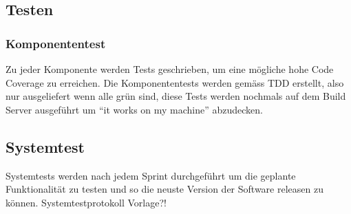 \documentclass[11pt]{scrartcl}
\begin{document}
\subsection{Testen}
\subsubsection{Komponententest}
Zu jeder Komponente werden Tests geschrieben, um eine mögliche hohe Code 
Coverage zu erreichen.
Die Komponententests werden gemäss TDD erstellt, also nur ausgeliefert wenn alle 
grün sind, diese Tests werden nochmals auf dem Build Server ausgeführt um ``it 
works on my machine'' abzudecken.
\subsection{Systemtest}
Systemtests werden nach jedem Sprint durchgeführt um die geplante Funktionalität 
zu testen und so die neuste Version der Software releasen zu können.
Systemtestprotokoll Vorlage?!
\end{document}
